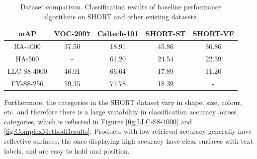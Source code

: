 \begin{table}
\begin{center}
    \begin{tabular}{ccccc}
    \toprule
    mAP & VOC-2007 & Caltech-101 & SHORT-ST & SHORT-VF \\
	\midrule
    HA-4000                    & 37.50    & 18.91       & 45.86       & 36.86 \\
    HA-500                     & -        & 61.20       & 24.54       & 22.39       \\
    LLC-S8-4000                & 46.01    & 66.64       & 17.89       & 11.20       \\
    FV-S8-256                  & 59.35    & 77.78       & 18.39       & -           \\
	\bottomrule
    \end{tabular}
	\end{center}
    \caption{Dataset comparison. Classification results of baseline performance algorithms on SHORT and other existing datasets.}
    \label{table:dataset_comparison}
\end{table}


Furthermore, the categories in the SHORT dataset vary in shape, size, colour, etc. and therefore there is a large variability in classification accuracy across categories, which is reflected in Figures \ref{fig:LLC-S8-4000} and \ref{fig:ComplexMethodResults}. Products with low retrieval accuracy generally have reflective surfaces; the ones displaying high accuracy have clear surfaces with text labels, and are easy to hold and position. 



